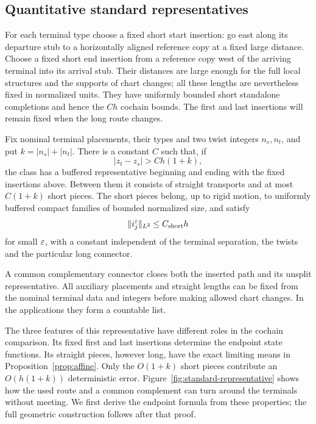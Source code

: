 \subsection{Quantitative standard representatives}

For each terminal type choose a fixed short start insertion: go east
along its departure stub to a horizontally aligned reference copy at a
fixed large distance.  Choose a fixed short end insertion from a
reference copy west of the arriving terminal into its arrival stub.
Their distances are large enough for the full local structures and the
supports of chart changes; all these lengths are nevertheless fixed in
normalized units.  They have uniformly bounded short standalone
completions and hence the $C h$ cochain bounds.  The first and last
insertions will remain fixed when the long route changes.

\begin{lemma}
\label{lemma:standard-spirals}
Fix nominal terminal placements, their types and two twist integers
$n_s,n_t$, and put $k=|n_s|+|n_t|$.  There is a constant $C$ such that,
if
\[
 |z_t-z_s|>Ch(1+k),
\]
the class has a buffered representative beginning and ending with the
fixed insertions above.  Between them it consists of straight transports
and at most $C(1+k)$ short pieces.  The short pieces belong, up to rigid
motion, to uniformly buffered compact families of bounded normalized
size, and satisfy
\[
 \|i_j^\varepsilon\|_{L^2}\le C_{\rm short}h
\]
for small $\varepsilon$, with a constant independent of the terminal separation,
the twists and the particular long connector.

A common complementary connector closes both the inserted path and its
unsplit representative.  All auxiliary placements and straight lengths
can be fixed from the nominal terminal data and integers before making
allowed chart changes.  In the applications they form a countable list.
\end{lemma}


The three features of this representative have different roles in the
cochain comparison. Its fixed first and last insertions determine the
endpoint state functions. Its straight pieces, however long, have the
exact limiting means in Proposition~\ref{prop:affine}. Only the
$O(1+k)$ short pieces contribute an $O(h(1+k))$ deterministic error.
Figure~\ref{fig:standard-representative} shows how the used route and a
common complement can turn around the terminals without meeting.
We first derive the endpoint formula from these properties; the full
geometric construction follows after that proof.

